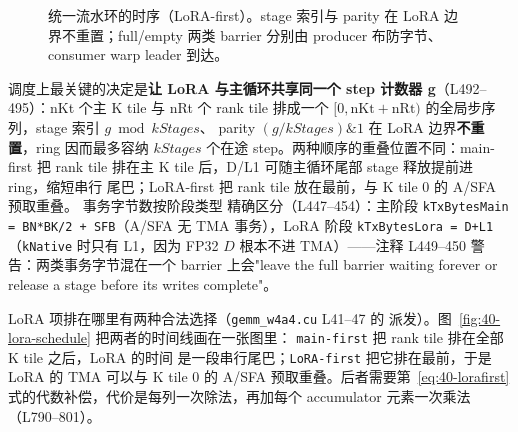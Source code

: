 \begin{figure}[H]
\caption{统一流水环的时序（LoRA-first）。stage 索引与 parity 在 LoRA
边界不重置；full/empty 两类 barrier 分别由 producer 布防字节、consumer
warp leader 到达。}
\label{fig:40-ws-timeline}
\end{figure}

调度上最关键的决定是\textbf{让 LoRA 与主循环共享同一个 step 计数器
g}（L492--495）：nKt 个主 K tile 与 nRt 个 rank tile 排成一个
$[0,\mathrm{nKt+nRt})$ 的全局步序列，stage 索引 $g\bmod kStages$、
parity $(g/kStages)\&1$ 在 LoRA 边界\textbf{不重置}，ring 因而最多容纳
$kStages$ 个在途 step。两种顺序的重叠位置不同：main-first 把 rank tile
排在主 K tile 后，D/L1 可随主循环尾部 stage 释放提前进 ring，缩短串行
尾巴；LoRA-first 把 rank tile 放在最前，与 K tile 0 的 A/SFA 预取重叠。
事务字节数按阶段类型
精确区分（L447--454）：主阶段
\texttt{kTxBytesMain = BN*BK/2 + SFB}（A/SFA 无 TMA 事务），LoRA 阶段
\texttt{kTxBytesLora = D+L1}（\texttt{kNative} 时只有 L1，因为 FP32
$D$ 根本不进 TMA）——注释 L449--450 警告：两类事务字节混在一个
barrier 上会"leave the full barrier waiting forever or release a
stage before its writes complete"。

LoRA 项排在哪里有两种合法选择（\texttt{gemm\_w4a4.cu} L41--47 的
派发）。图~\ref{fig:40-lora-schedule} 把两者的时间线画在一张图里：
\texttt{main-first} 把 rank tile 排在全部 K tile 之后，LoRA 的时间
是一段串行尾巴；\texttt{LoRA-first} 把它排在最前，于是 LoRA 的 TMA
可以与 K tile 0 的 A/SFA 预取重叠。后者需要第~\ref{eq:40-lorafirst}
式的代数补偿，代价是每列一次除法，再加每个 accumulator 元素一次乘法
（L790--801）。

